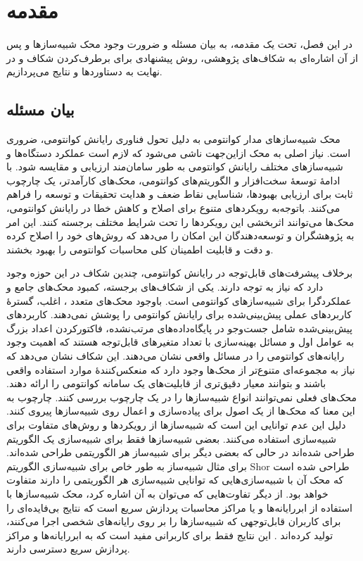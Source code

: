 \chapter{مقدمه}
در این فصل، تحت یک مقدمه، به بیان مسئله و ضرورت وجود محک شبیه‌سازها و پس از آن اشاره‌ای به شکاف‌های پژوهشی، روش پیشنهادی برای برطرف‌کردن شکاف و در نهایت به دستاوردها و نتایج می‌پردازیم.
\section{بیان مسئله}
محک شبیه‌سازهای مدار کوانتومی به دلیل تحول فناوری رایانش کوانتومی، ضروری است. نیاز اصلی به محک ازاین‌جهت ناشی می‌شود که لازم است عملکرد دستگاه‌ها و شبیه‌سازهای مختلف رایانش کوانتومی به طور سامان‌مند ارزیابی و مقایسه شود. با ادامهٔ توسعهٔ سخت‌افزار و الگوریتم‌های کوانتومی، محک‌های کارآمدتر، یک چارچوب ثابت برای ارزیابی بهبودها، شناسایی نقاط ضعف و هدایت تحقیقات و توسعه را فراهم می‌کنند. باتوجه‌به رویکردهای متنوع برای اصلاح و کاهش خطا در رایانش کوانتومی، محک‌ها می‌توانند اثربخشی این رویکرد‌ها را تحت شرایط مختلف برجسته کنند. این امر به پژوهشگران و توسعه‌دهندگان این امکان را می‌دهد که روش‌های خود را اصلاح کرده و دقت و قابلیت اطمینان کلی محاسبات کوانتومی را بهبود بخشند\cite{lubinski_application-oriented_2023}.

برخلاف پیشرفت‌های قابل‌توجه در رایانش کوانتومی، چندین شکاف در این حوزه وجود دارد که نیاز به توجه دارند. یکی از شکاف‌های برجسته، کمبود محک‌های جامع و عملکردگرا برای شبیه‌سازهای کوانتومی است. باوجود محک‌های متعدد 
\cite{michielsen_benchmarking_2017, wright_benchmarking_2019, koch_demonstrating_2020, mills_application-motivated_2021, cornelissen_scalable_2021}،
اغلب، گسترهٔ کاربردهای عملی پیش‌بینی‌شده برای رایانش کوانتومی را پوشش نمی‌دهند. کاربردهای پیش‌بینی‌شده شامل جست‌وجو در پایگاه‌داده‌های مرتب‌نشده، فاکتورکردن اعداد بزرگ به عوامل اول و مسائل بهینه‌سازی با تعداد متغیرهای قابل‌توجه هستند که اهمیت وجود رایانه‌های کوانتومی را در مسائل واقعی نشان می‌دهند. این شکاف نشان می‌دهد که نیاز به مجموعه‌ای متنوع‌تر از محک‌ها وجود دارد که منعکس‌کنندهٔ موارد استفاده واقعی باشند و بتوانند معیار دقیق‌تری از قابلیت‌های یک سامانه کوانتومی را ارائه دهند. 
محک‌های فعلی نمی‌توانند انواع شبیه‌سازها را در یک چارچوب بررسی کنند. چارچوب به این معنا که محک‌ها از یک اصول برای پیاده‌سازی و اعمال روی شبیه‌سازها پیروی کنند. دلیل این عدم توانایی این است که شبیه‌سازها از رویکردها و روش‌های متفاوت برای شبیه‌سازی استفاده می‌کنند. بعضی شبیه‌سازها فقط برای شبیه‌سازی یک الگوریتم طراحی شده‌اند در حالی که بعضی دیگر برای شبیه‌ساز هر الگوریتمی طراحی شده‌اند.
برای مثال شبیه‌ساز
\cite{noauthor_quantum_nodate-1}
به طور خاص برای شبیه‌سازی الگوریتم Shor طراحی شده است که محک آن با شبیه‌سازی‌هایی که توانایی شبیه‌سازی هر الگوریتمی را دارند متفاوت خواهد بود. از دیگر تفاوت‌هایی که می‌توان به آن اشاره کرد، محک شبیه‌سازها با استفاده از ابررایانه‌ها و یا مراکز محاسبات پردازش سریع است که نتایج بی‌فایده‌ای را برای کاربران قابل‌توجهی که شبیه‌سازها را بر روی رایانه‌های شخصی اجرا می‌کنند، تولید کرده‌اند 
\cite{jamadagni_benchmarking_2024}.
این نتایج فقط برای کاربرانی مفید است که به ابررایانه‌ها و مراکز پردازش سریع دسترسی دارند.

